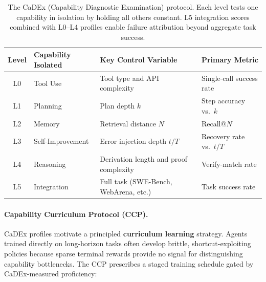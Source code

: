 \begin{table}[tbp]
\centering
\footnotesize
\begin{tabularx}{\textwidth}{cYY>{\raggedright\arraybackslash}p{3.5cm}}
\toprule
\textbf{Level} & \textbf{Capability Isolated} & \textbf{Key Control Variable} & \textbf{Primary Metric} \\
\midrule
L0 & Tool Use        & Tool type and API complexity         & Single-call success rate \\
L1 & Planning        & Plan depth $k$                       & Step accuracy vs.\ $k$ \\
L2 & Memory          & Retrieval distance $N$               & Recall@$N$ \\
L3 & Self-Improvement & Error injection depth $t/T$          & Recovery rate vs.\ $t/T$ \\
L4 & Reasoning       & Derivation length and proof complexity & Verify-match rate \\
L5 & Integration     & Full task (SWE-Bench, WebArena, etc.) & Task success rate \\
\bottomrule
\end{tabularx}
\caption{The CaDEx (Capability Diagnostic Examination) protocol. Each level tests one capability in isolation by holding all others constant. L5 integration scores combined with L0--L4 profiles enable failure attribution beyond aggregate task success.}
\label{tbl:cadex}
\end{table}

\paragraph{Capability Curriculum Protocol (CCP).} CaDEx profiles motivate a principled \textbf{curriculum learning} strategy. Agents trained directly on long-horizon tasks often develop brittle, shortcut-exploiting policies because sparse terminal rewards provide no signal for distinguishing capability bottlenecks. The CCP prescribes a staged training schedule gated by CaDEx-measured proficiency:

